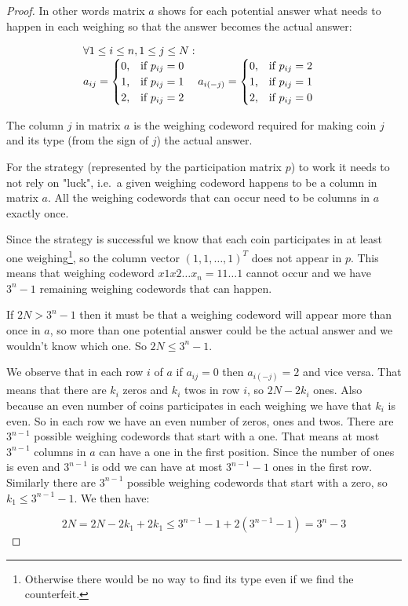 \begin{proof}
In other words matrix $a$ shows for each potential answer what needs to happen in each weighing so that the answer becomes the actual answer:

$$
\begin{array}{l}
\forall 1 \leq i \leq n, 1 \leq j \leq N: \\
a_{ij} = 
\begin{cases}
0  \text{,\quad if } p_{ij} = 0\\
1  \text{,\quad if } p_{ij} = 1\\
2  \text{,\quad if } p_{ij} = 2
\end{cases}
a_{i(-j)} = 
\begin{cases}
0  \text{,\quad if } p_{ij} = 2\\
1  \text{,\quad if } p_{ij} = 1\\
2  \text{,\quad if } p_{ij} = 0
\end{cases}
\end{array}
$$

The column $j$ in matrix $a$ is the weighing codeword required for making coin $j$ and its type (from the sign of $j$) the actual answer.

For the strategy (represented by the participation matrix $p$) to work it needs to not rely on "luck", i.e.\ a given weighing codeword happens to be a column in matrix $a$. All the weighing codewords that can occur need to be columns in $a$ exactly once. 

Since the strategy is successful we know that each coin participates in at least one weighing\footnote{Otherwise there would be no way to find its type even if we find the counterfeit.}, so the column vector $(1, 1, \ldots, 1)^T$ does not appear in $p$. This means that weighing codeword $x1 x2 \ldots x_n=11\ldots1$ cannot occur and we have $3^n - 1$ remaining weighing codewords that can happen.

If $2 N > 3^n - 1$ then it must be that a weighing codeword will appear more than once in $a$, so more than one potential answer could be the actual answer and we wouldn't know which one. So $2 N \leq 3^n - 1$.

We observe that in each row $i$ of $a$ if $a_{ij}=0$ then $a_{i(-j)}=2$ and vice versa. That means that there are $k_i$ zeros and $k_i$ twos in row $i$, so $2 N - 2 k_i$ ones. Also because an even number of coins participates in each weighing we have that $k_i$ is even. So in each row we have an even number of zeros, ones and twos. There are $3^{n - 1}$ possible weighing codewords that start with a one. That means at most $3^{n-1}$ columns in $a$ can have a one in the first position. Since the number of ones is even and $3^{n-1}$ is odd we can have at most $3^{n-1}-1$ ones in the first row. Similarly there are $3^{n - 1}$ possible weighing codewords that start with a zero, so $k_1 \leq 3^{n-1} - 1$. We then have:

$$
2N = 2N - 2 k_1 + 2 k_1 \leq 3^{n-1} - 1 + 2 (3^{n-1} - 1) = 3^n - 3    
$$
\end{proof}

